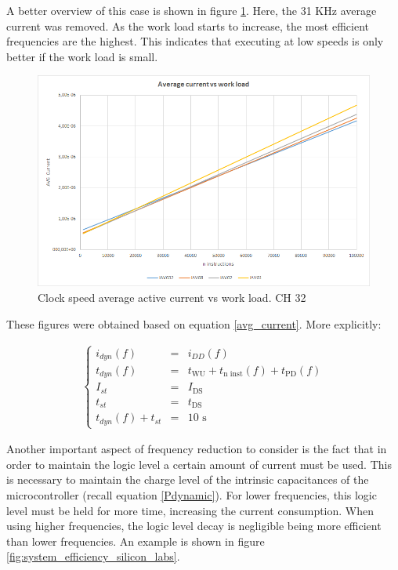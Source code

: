 \documentclass[11pt,a4paper]{report}
\begin{document}
A better overview of this case is shown in figure \ref{fig:Average_power_vs_work_load}. Here, the 31 KHz average current was removed. As the work load starts to increase, the most efficient frequencies are the highest. This indicates that executing at low speeds is only better if the work load is small. 

\begin{figure}[ht!]
\centering
\includegraphics[width=0.9\linewidth]{./Average_power_vs_work_load}
\caption{Clock speed average active current vs work load. CH 32 \cite{PIC24FJ128GA204} \cite{Power_saving_deep_sleep}}
\label{fig:Average_power_vs_work_load}
\end{figure}

These figures were obtained based on equation \ref{avg_current}. More explicitly:

\begin{eqnarray}\nonumber
\left\{\begin{matrix}
i_{dyn}(f) &=& i_{DD}(f) \\
t_{dyn}(f) &=& t_{\text{WU}} + t_{\text{n inst}}(f) + t_{\text{PD}}(f)\\
I_{st} &=& I_{\text{DS}} \\
t_{st}  &=& t_{\text{DS}} \\
t_{dyn}(f) + t_{st} &=& 10 \text{ s} 	
\end{matrix}\right.
\end{eqnarray}

Another important aspect of frequency reduction to consider is the fact that in order to maintain the logic level a certain amount of current must be used. This is necessary to maintain the charge level of the intrinsic capacitances of the microcontroller (recall equation \ref{Pdynamic}). For lower frequencies, this logic level must be held for more time, increasing the current consumption. When using higher frequencies, the logic level decay is negligible being more efficient than lower frequencies. An example is shown in figure \ref{fig:system_efficiency_silicon_labs}.
\end{document}
